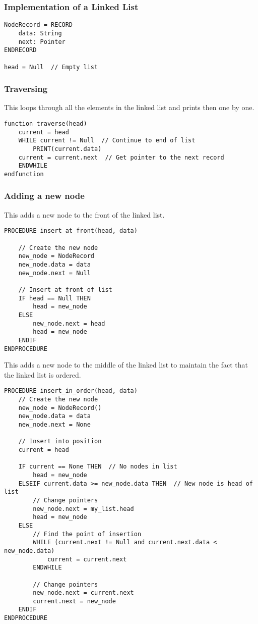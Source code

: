 \documentclass[a4paper,11pt]{article}
\begin{document}
\subsubsection{Implementation of a Linked List}
\begin{Verbatim}[breaklines=true, breakanywhere=true]
NodeRecord = RECORD
    data: String 
    next: Pointer
ENDRECORD

head = Null  // Empty list
\end{Verbatim}
\subsubsection{Traversing}
This loops through all the elements in the linked list and prints then one by one.
\begin{Verbatim}[breaklines=true, breakanywhere=true]
function traverse(head)
    current = head  
    WHILE current != Null  // Continue to end of list  
        PRINT(current.data)
 	current = current.next  // Get pointer to the next record 
    ENDWHILE
endfunction
\end{Verbatim}
\subsubsection{Adding a new node}
This adds a new node to the front of the linked list.
\begin{Verbatim}[breaklines=true, breakanywhere=true]
PROCEDURE insert_at_front(head, data)

    // Create the new node
    new_node = NodeRecord
    new_node.data = data
    new_node.next = Null
    
    // Insert at front of list
    IF head == Null THEN
        head = new_node
    ELSE
        new_node.next = head
    	head = new_node
    ENDIF
ENDPROCEDURE 
\end{Verbatim}
This adds a new node to the middle of the linked list to maintain the fact that the linked list is ordered.
\begin{Verbatim}[breaklines=true, breakanywhere=true]
PROCEDURE insert_in_order(head, data)
    // Create the new node
    new_node = NodeRecord() 
    new_node.data = data
    new_node.next = None
    
    // Insert into position
    current = head

    IF current == None THEN  // No nodes in list
        head = new_node  
    ELSEIF current.data >= new_node.data THEN  // New node is head of list
        // Change pointers
        new_node.next = my_list.head 
        head = new_node 
    ELSE
        // Find the point of insertion          
        WHILE (current.next != Null and current.next.data < new_node.data)
            current = current.next 
        ENDWHILE
        
        // Change pointers
        new_node.next = current.next 
        current.next = new_node         
    ENDIF
ENDPROCEDURE
\end{Verbatim}
\end{document}
